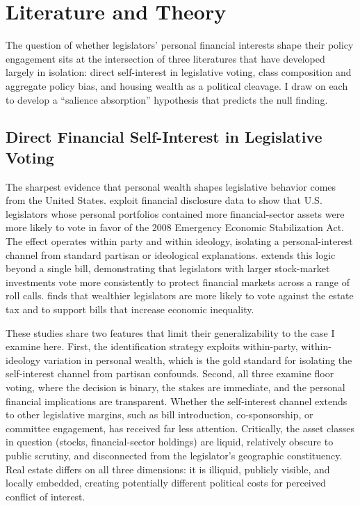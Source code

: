 \documentclass[11pt]{article}
\begin{document}
\section{Literature and Theory}
\label{sec:lit}

The question of whether legislators' personal financial interests shape their policy engagement sits at the intersection of three literatures that have developed largely in isolation: direct self-interest in legislative voting, class composition and aggregate policy bias, and housing wealth as a political cleavage. I draw on each to develop a ``salience absorption'' hypothesis that predicts the null finding.

\subsection{Direct Financial Self-Interest in Legislative Voting}

The sharpest evidence that personal wealth shapes legislative behavior comes from the United States. \citet{tahoun2018} exploit financial disclosure data to show that U.S. legislators whose personal portfolios contained more financial-sector assets were more likely to vote in favor of the 2008 Emergency Economic Stabilization Act. The effect operates within party and within ideology, isolating a personal-interest channel from standard partisan or ideological explanations. \citet{grose2013} extends this logic beyond a single bill, demonstrating that legislators with larger stock-market investments vote more consistently to protect financial markets across a range of roll calls. \citet{carnes2015} finds that wealthier legislators are more likely to vote against the estate tax and to support bills that increase economic inequality.

These studies share two features that limit their generalizability to the case I examine here. First, the identification strategy exploits within-party, within-ideology variation in personal wealth, which is the gold standard for isolating the self-interest channel from partisan confounds. Second, all three examine floor voting, where the decision is binary, the stakes are immediate, and the personal financial implications are transparent. Whether the self-interest channel extends to other legislative margins, such as bill introduction, co-sponsorship, or committee engagement, has received far less attention. Critically, the asset classes in question (stocks, financial-sector holdings) are liquid, relatively obscure to public scrutiny, and disconnected from the legislator's geographic constituency. Real estate differs on all three dimensions: it is illiquid, publicly visible, and locally embedded, creating potentially different political costs for perceived conflict of interest.
\end{document}
